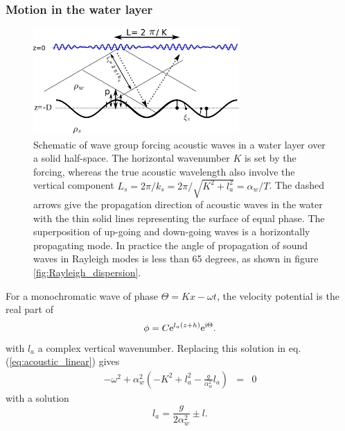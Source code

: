 \subsubsection{Motion in the water layer}
\begin{figure}[ht]
\centerline{\includegraphics[width=0.7\textwidth]{FIGS_CH_SISMO/water_and_crust.pdf}}
  \caption{Schematic of wave group forcing acoustic waves in a water layer over a solid half-space. 
  The horizontal wavenumber $K$ is set by the forcing, whereas the true acoustic wavelength also involve the vertical 
  component $L_s=2\pi /k_s=2\pi /\sqrt{K^2+l_a^2}=\alpha_w/T$. The dashed arrows give the propagation direction of 
  acoustic waves in the water with the thin solid lines representing the surface of equal phase. 
  The superposition of up-going and down-going waves is a horizontally propagating mode. 
  In practice the angle of propagation of sound waves in Rayleigh modes is less than 65 degrees, as shown in figure \ref{fig:Rayleigh_dispersion}. }
\label{fig:water_and_crust}
\end{figure}

For a monochromatic wave of phase $\Theta = K x-\omega t$, the velocity potential is the real part of 
\begin{eqnarray}
 \phi = C \mathrm{e}^{l_a (z+h)} \mathrm{e}^{\mathrm{i} \Theta}.
\end{eqnarray}
 with  $l_a$  a complex vertical wavenumber.  Replacing this solution in eq. (\ref{eq:acoustic_linear}) gives 
\begin{eqnarray}
 -\omega^2  + \alpha_w^2 \left( -K^2 +l_a^2 -  \frac{g}{\alpha_w^2} l_a\right)  & = & 0
\end{eqnarray}
with a solution
\begin{equation}
 l_a = \frac{  g}{2 \alpha_w^2} \pm l.
\end{equation}

